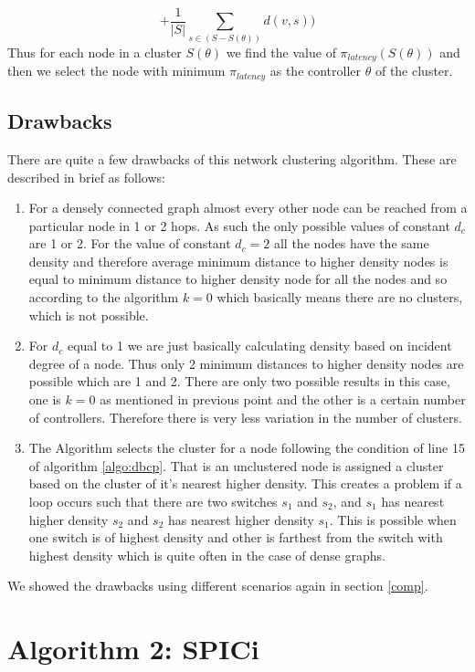 \documentclass[10pt]{extarticle}
\begin{document}
	\begin{equation}
	+ \frac{1}{|S|} \sum_{s\in (S-S(\theta))}d(v,s))
	\end{equation}
	Thus for each node in a cluster $S(\theta)$ we find the value of $\pi_{latency}(S(\theta))$ and then we select the node with minimum $\pi_{latency}$ as the controller $\theta$ of the cluster.
	
	\subsection{Drawbacks}
	There are quite a few drawbacks of this network clustering algorithm. These are described in brief as follows:
	
	\begin{enumerate}
		\item For a densely connected graph almost every other node can be reached from a particular node in 1 or 2 hops. As such the only possible values of constant $d_c$ are 1 or 2. For the value of constant $d_c=2$ all the nodes have the same density and therefore average minimum distance to higher density nodes is equal to minimum distance to higher density node for all the nodes and so according to the algorithm $k=0$ which basically means there are no clusters, which is not possible.
		\item For $d_c$ equal to 1 we are just basically calculating density based on incident degree of a node. Thus only 2 minimum distances to higher density nodes are possible which are 1 and 2.
		There are only two possible results in this case, one is $k=0$ as mentioned in previous point and the other is a certain number of controllers. Therefore there is very less variation in the number of clusters.
		\item The Algorithm selects the cluster for a node following the condition of line 15 of algorithm \ref{algo:dbcp}. That is an unclustered node is assigned a cluster based on the cluster of it's nearest higher density. This creates a problem if a loop occurs such that there are two switches $s_1$ and $s_2$, and $s_1$ has nearest higher density $s_2$ and $s_2$ has nearest higher density $s_1$. This is possible when one switch is of highest density and other is farthest from the switch with highest density which is quite often in the case of dense graphs.
	\end{enumerate}
	
	We showed the drawbacks using different scenarios again in section \ref{comp}.
	
	\section{Algorithm 2: SPICi}	\label{algo:spici}
	
\end{document}
